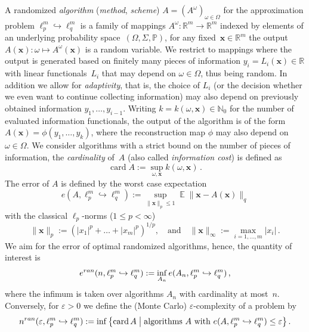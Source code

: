 \documentclass[12pt]{article}
\theoremstyle{plain}
\theoremstyle{definition}
\renewcommand{\P}{{\mathbb P}}
\newcommand{\expect}{\operatorname{\mathbb{E}}}
\DeclareMathOperator{\card}{card}
\newcommand{\ran}{\textup{ran}}
\newcommand{\eps}{\varepsilon}
\newcommand{\embed}{\hookrightarrow}
\renewcommand{\vec}{\boldsymbol}
\newcommand{\R}{{\mathbb R}}
\newcommand{\N}{{\mathbb N}}
\begin{document}
A randomized \emph{algorithm} (\emph{method}, \emph{scheme}) $A = (A^\omega)_{\omega \in \Omega}$ 
for the approximation problem $\ell_p^m \embed \ell_q^m$
is a family of mappings $A^\omega : \R^m \to \R^m$
indexed by elements of an underlying probability space~$(\Omega,\Sigma,\P)$,
for any fixed~$\vec{x} \in \R^m$ the output $A(\vec{x})\colon \omega \mapsto A^\omega(\vec{x})$ is a random variable. 
We restrict to mappings where the output is generated
based on finitely many pieces of information $y_i = L_i(\vec{x}) \in \R$ with linear functionals~$L_i$ that may depend on $\omega \in \Omega$, thus being random.
In addition we allow for \emph{adaptivity}, that is, the choice of $L_i$ (or the decision whether we even want to continue collecting information) may also depend on previously obtained information $y_1,\ldots,y_{i-1}$.
Writing $k = k(\omega,\vec{x}) \in \N_0$ for the number of evaluated information functionals, 
the output of the algorithm is of the form $A(\vec{x}) = \phi(y_1,\ldots,y_k)$,
where the reconstruction map $\phi$ may also depend on $\omega \in \Omega$.
We consider algorithms with a strict bound on the number of pieces of information,
the \emph{cardinality} of~$A$ (also called \emph{information cost}) is defined as
\begin{equation*}
    \card A := \sup_{\omega,\vec{x}} k(\omega,\vec{x}) \,.
\end{equation*}
The error of $A$ is defined by the worst case expectation
\begin{equation} \label{eq:e(A_n)}
    e(A,\ell_p^m \embed \ell_q^m)
        := \sup_{\|\vec{x}\|_p \leq 1} \expect \|\vec{x} - A(\vec{x})\|_q
\end{equation}
with the classical $\ell_p$-norms ($1 \leq p < \infty$)
\begin{equation*}
    \|\vec{x}\|_p := \left(|x_1|^p + \ldots + |x_m|^p\right)^{1/p},
    \quad \text{and} \quad \|\vec{x}\|_\infty := \max_{i=1,\ldots,m} |x_i| \,.
\end{equation*}
We aim for the error of optimal randomized algorithms, hence, the quantity of interest is
\begin{equation} \label{eq:e(n)}
    e^{\ran}(n,\ell_p^m \embed \ell_q^m)
        := \inf_{A_n} e(A_n,\ell_p^m \embed \ell_q^m) \,,
\end{equation}
where the infimum is taken over algorithms $A_n$ with cardinality at most~$n$.
Conversely, for $\eps > 0$ we define the (Monte Carlo) $\eps$-complexity of a problem by
\begin{equation*}
    n^{\ran}(\eps,\ell_p^m \embed \ell_q^m)
        := \inf\left\{\card A \;\middle|\;
                        \text{algorithms $A$ with }
                        e(A,\ell_p^m \embed \ell_q^m) \leq \eps
                \right\} .
\end{equation*}
\end{document}
